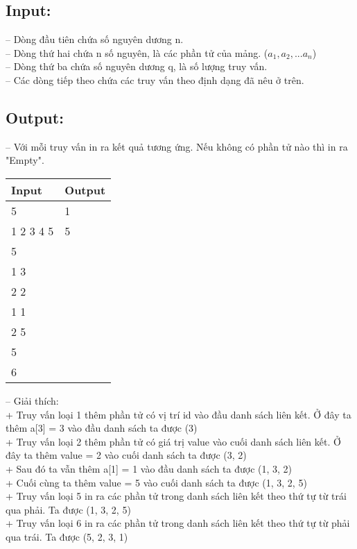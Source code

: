 \subsection*{Input:}
-- Dòng đầu tiên chứa số nguyên dương n.\\
-- Dòng thứ hai chứa n số nguyên, là các phần tử của mảng. ($a_{1}, a_{2}, ... a_{n}$)\\
-- Dòng thứ ba chứa số nguyên dương q, là số lượng truy vấn.\\
-- Các dòng tiếp theo chứa các truy vấn theo định dạng đã nêu ở trên.
\vspace{-1.em}
\subsection*{Output:}
-- Với mỗi truy vấn in ra kết quả tương ứng. Nếu không có phần tử nào thì in ra "Empty".\\
\begin{table}[h!]
\centering
\begin{tabularx}{0.8\textwidth}{|X|X|}
\hline
\textbf{Input} & \textbf{Output} \\
\hline
5 & 1\quad 3\quad 2\quad 5\\
1 2 3 4 5& 5\quad 2\quad 3\quad 1\\
5&\\
1 3&\\
2 2&\\
1 1&\\
2 5&\\
5&\\
6&\\
\hline
\end{tabularx}
\end{table}
-- Giải thích:\\
+ Truy vấn loại 1 thêm phần tử có vị trí id vào đầu danh sách liên kết. Ở đây ta thêm a[3] = 3 vào đầu danh sách ta được (3)\\
+ Truy vấn loại 2 thêm phần tử có giá trị value vào cuối danh sách liên kết. Ở đây ta thêm value = 2 vào cuối danh sách ta được (3, 2)\\
+ Sau đó ta vẫn thêm a[1] = 1 vào đầu danh sách ta được (1, 3, 2)\\
+ Cuối cùng ta thêm value = 5 vào cuối danh sách ta được (1, 3, 2, 5)\\
+ Truy vấn loại 5 in ra các phần tử trong danh sách liên kết theo thứ tự từ trái qua phải. Ta được (1, 3, 2, 5)\\
+ Truy vấn loại 6 in ra các phần tử trong danh sách liên kết theo thứ tự từ phải qua trái. Ta được (5, 2, 3, 1)\\
\vspace{-1.5em}
